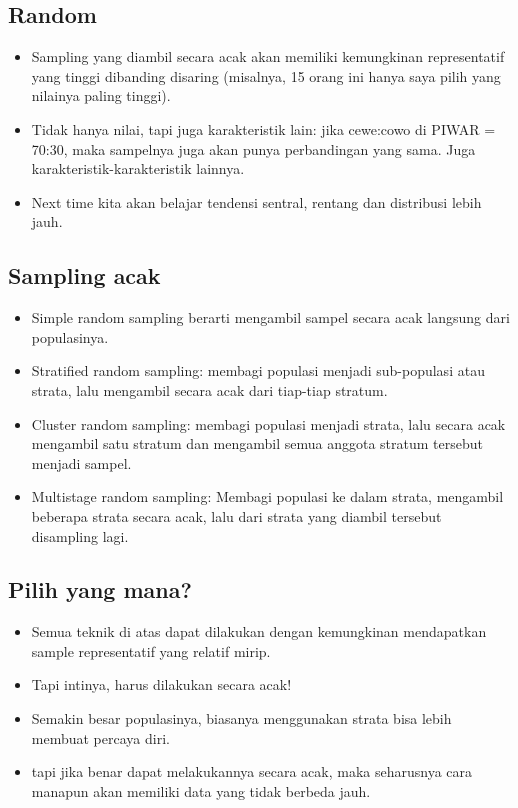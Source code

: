 \documentclass[
  letterpaper,
  DIV=11,
  numbers=noendperiod]{scrartcl}
\begin{document}
\hypertarget{random}{%
\subsection{Random}\label{random}}

\begin{itemize}
\item
  Sampling yang diambil secara acak akan memiliki kemungkinan
  representatif yang tinggi dibanding disaring (misalnya, 15 orang ini
  hanya saya pilih yang nilainya paling tinggi).
\item
  Tidak hanya nilai, tapi juga karakteristik lain: jika cewe:cowo di
  PIWAR = 70:30, maka sampelnya juga akan punya perbandingan yang sama.
  Juga karakteristik-karakteristik lainnya.
\item
  Next time kita akan belajar tendensi sentral, rentang dan distribusi
  lebih jauh.
\end{itemize}

\hypertarget{sampling-acak}{%
\subsection{Sampling acak}\label{sampling-acak}}

\begin{itemize}
\item
  Simple random sampling berarti mengambil sampel secara acak langsung
  dari populasinya.
\item
  Stratified random sampling: membagi populasi menjadi sub-populasi atau
  strata, lalu mengambil secara acak dari tiap-tiap stratum.
\item
  Cluster random sampling: membagi populasi menjadi strata, lalu secara
  acak mengambil satu stratum dan mengambil semua anggota stratum
  tersebut menjadi sampel.
\item
  Multistage random sampling: Membagi populasi ke dalam strata,
  mengambil beberapa strata secara acak, lalu dari strata yang diambil
  tersebut disampling lagi.
\end{itemize}

\hypertarget{pilih-yang-mana}{%
\subsection{Pilih yang mana?}\label{pilih-yang-mana}}

\begin{itemize}
\item
  Semua teknik di atas dapat dilakukan dengan kemungkinan mendapatkan
  sample representatif yang relatif mirip.
\item
  Tapi intinya, harus dilakukan secara acak!
\item
  Semakin besar populasinya, biasanya menggunakan strata bisa lebih
  membuat percaya diri.
\item
  tapi jika benar dapat melakukannya secara acak, maka seharusnya cara
  manapun akan memiliki data yang tidak berbeda jauh.
\end{itemize}
\end{document}
